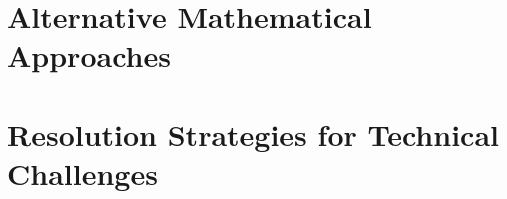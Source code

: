 \documentclass[11pt,a4paper]{report}
\begin{document}
\chapter{Alternative Mathematical Approaches}
\label{ch:alt-frameworks}
% 
% 
% 
% 
% 
% 
% 
% 
% 
% 
% 
% 


\chapter{Resolution Strategies for Technical Challenges}
\label{ch:gap-resolution}

% 
% 
% 
% 
% 
% 
% 

% 
% 

%
%
%
%
%


\end{document}
